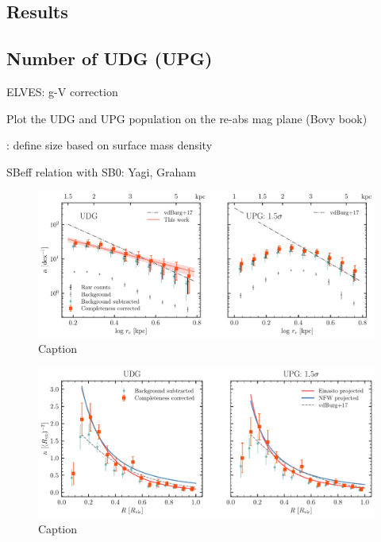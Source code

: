 \documentclass[twocolumn,astrosymb,twocolappendix]{aastex631}
\begin{document}
\begin{CJK*}{UTF8}{gbsn}
\section{Results}

\subsection{Number of UDG (UPG)}\label{sec:n_udg}


ELVES: g-V correction

Plot the UDG and UPG population on the re-abs mag plane (Bovy book)

\citet{Trujillo2020}: define size based on surface mass density



SBeff relation with SB0: Yagi, Graham




\begin{figure}
	\vbox{ 
		\centering
		\includegraphics[width=1\linewidth]{size_distribution.pdf}
	}
    \caption{Caption}
    \label{fig:size_distribution}
\end{figure}


\begin{figure}
	\vbox{ 
		\centering
		\includegraphics[width=1\linewidth]{radial_distribution.pdf}
	}
    \caption{Caption}
    \label{fig:radial_distribution}
\end{figure}



\end{CJK*}
\end{document}
